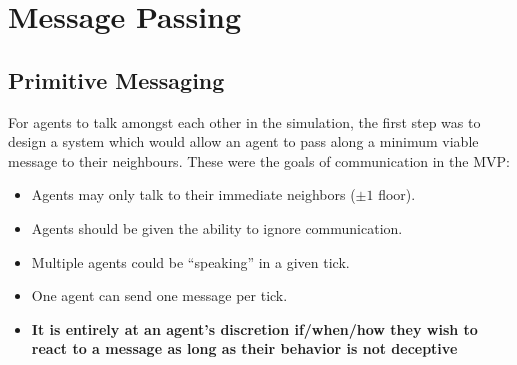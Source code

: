 \section{Message Passing}\label{message_passing}
\subsection{Primitive Messaging}
For agents to talk amongst each other in the simulation, the first step was to design a system which would allow an agent to pass along a minimum viable message to their neighbours. These were the goals of communication in the MVP:
\begin{itemize}
    \item Agents may only talk to their immediate neighbors ($\pm1$ floor).
    \item Agents should be given the ability to ignore communication.
    \item Multiple agents could be ``speaking'' in a given tick.
    \item One agent can send one message per tick.
    \item \textbf{It is entirely at an agent's discretion if/when/how they wish to react to a message as long as their behavior is not deceptive}
\end{itemize}

